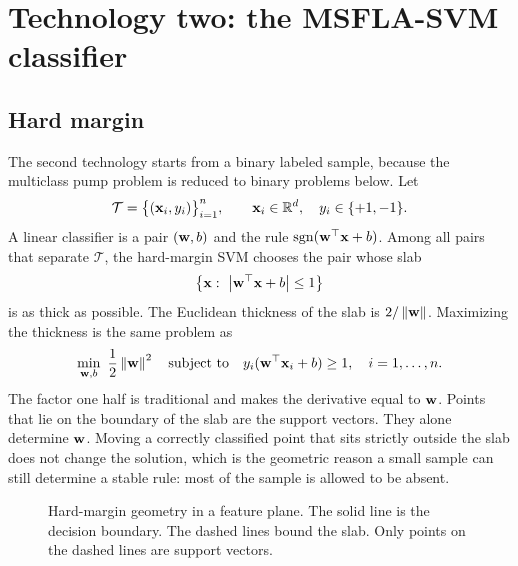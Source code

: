 \section{Technology two: the MSFLA-SVM classifier}
\label{sec:svm}

\subsection{Hard margin}

The second technology starts from a binary labeled sample, because the multiclass pump problem is reduced to binary problems below.
Let
\begin{equation}
\mathcal{T}=\bigl\{(\mathbf{x}_{i}, y_{i})\bigr\}_{i=1}^{n},
\qquad \mathbf{x}_{i}\in\mathbb{R}^{d},\quad y_{i}\in\{+1,-1\}.
\label{eq:binset}
\end{equation}
A linear classifier is a pair \((\mathbf{w}, b)\) and the rule \(\operatorname{sgn}(\mathbf{w}^{\top}\mathbf{x}+b)\).
Among all pairs that separate \(\mathcal{T}\), the hard-margin SVM chooses the pair whose slab
\begin{equation}
\bigl\{\vect{x}:\ \abs{\vect{w}^{\top}\vect{x}+b}\le 1\bigr\}
\label{eq:slab}
\end{equation}
is as thick as possible.
The Euclidean thickness of the slab is \(2/\left\lVert \mathbf{w} \right\rVert\).
Maximizing the thickness is the same problem as
\begin{equation}
\min_{\vect{w}, b}\ \frac{1}{2}\norm{\vect{w}}^{2}
\quad\text{subject to}\quad
y_{i}(\vect{w}^{\top}\vect{x}_{i}+b)\ge 1,
\quad i=1,\ldots,n.
\label{eq:hard}
\end{equation}
The factor one half is traditional and makes the derivative equal to \(\mathbf{w}\).
Points that lie on the boundary of the slab are the support vectors.
They alone determine \(\mathbf{w}\).
Moving a correctly classified point that sits strictly outside the slab does not change the solution, which is the geometric reason a small sample can still determine a stable rule: most of the sample is allowed to be absent.

\begin{figure}[H]
\centering
{}
\caption{Hard-margin geometry in a feature plane. The solid line is the decision boundary. The dashed lines bound the slab. Only points on the dashed lines are support vectors.}
\label{fig:margin}
\end{figure}

